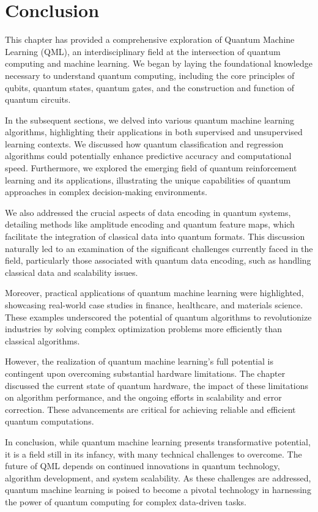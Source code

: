 \documentclass{book}
\begin{document}
\section *{Conclusion}

This chapter has provided a comprehensive exploration of Quantum Machine Learning (QML), an interdisciplinary field at the intersection of quantum computing and machine learning. We began by laying the foundational knowledge necessary to understand quantum computing, including the core principles of qubits, quantum states, quantum gates, and the construction and function of quantum circuits.

In the subsequent sections, we delved into various quantum machine learning algorithms, highlighting their applications in both supervised and unsupervised learning contexts. We discussed how quantum classification and regression algorithms could potentially enhance predictive accuracy and computational speed. Furthermore, we explored the emerging field of quantum reinforcement learning and its applications, illustrating the unique capabilities of quantum approaches in complex decision-making environments.

We also addressed the crucial aspects of data encoding in quantum systems, detailing methods like amplitude encoding and quantum feature maps, which facilitate the integration of classical data into quantum formats. This discussion naturally led to an examination of the significant challenges currently faced in the field, particularly those associated with quantum data encoding, such as handling classical data and scalability issues.

Moreover, practical applications of quantum machine learning were highlighted, showcasing real-world case studies in finance, healthcare, and materials science. These examples underscored the potential of quantum algorithms to revolutionize industries by solving complex optimization problems more efficiently than classical algorithms.

However, the realization of quantum machine learning's full potential is contingent upon overcoming substantial hardware limitations. The chapter discussed the current state of quantum hardware, the impact of these limitations on algorithm performance, and the ongoing efforts in scalability and error correction. These advancements are critical for achieving reliable and efficient quantum computations.

In conclusion, while quantum machine learning presents transformative potential, it is a field still in its infancy, with many technical challenges to overcome. The future of QML depends on continued innovations in quantum technology, algorithm development, and system scalability. As these challenges are addressed, quantum machine learning is poised to become a pivotal technology in harnessing the power of quantum computing for complex data-driven tasks.
\end{document}
